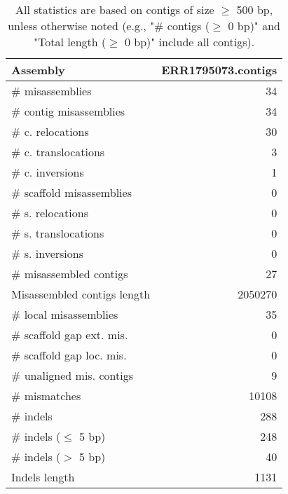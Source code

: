 \documentclass[12pt,a4paper]{article}
\begin{document}
\begin{table}[ht]
\begin{center}
\caption{All statistics are based on contigs of size $\geq$ 500 bp, unless otherwise noted (e.g., "\# contigs ($\geq$ 0 bp)" and "Total length ($\geq$ 0 bp)" include all contigs).}
\begin{tabular}{|l*{1}{|r}|}
\hline
Assembly & ERR1795073.contigs \\ \hline
\# misassemblies & 34 \\ \hline
\hspace{2mm}\# contig misassemblies & 34 \\ \hline
\hspace{5mm}\# c. relocations & 30 \\ \hline
\hspace{5mm}\# c. translocations & 3 \\ \hline
\hspace{5mm}\# c. inversions & 1 \\ \hline
\hspace{2mm}\# scaffold misassemblies & 0 \\ \hline
\hspace{5mm}\# s. relocations & 0 \\ \hline
\hspace{5mm}\# s. translocations & 0 \\ \hline
\hspace{5mm}\# s. inversions & 0 \\ \hline
\# misassembled contigs & 27 \\ \hline
Misassembled contigs length & 2050270 \\ \hline
\# local misassemblies & 35 \\ \hline
\# scaffold gap ext. mis. & 0 \\ \hline
\# scaffold gap loc. mis. & 0 \\ \hline
\# unaligned mis. contigs & 9 \\ \hline
\# mismatches & 10108 \\ \hline
\# indels & 288 \\ \hline
\hspace{5mm}\# indels ($\leq$ 5 bp) & 248 \\ \hline
\hspace{5mm}\# indels ($>$ 5 bp) & 40 \\ \hline
Indels length & 1131 \\ \hline
\end{tabular}
\end{center}
\end{table}
\end{document}
